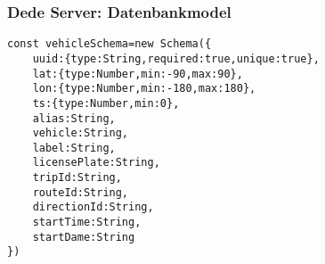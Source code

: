 
\begin{frame}[fragile]
\frametitle{Dede Server: Datenbankmodel}
\begin{lstlisting}
const vehicleSchema=new Schema({
    uuid:{type:String,required:true,unique:true},
    lat:{type:Number,min:-90,max:90},
    lon:{type:Number,min:-180,max:180},
    ts:{type:Number,min:0},
    alias:String,
    vehicle:String,
    label:String,
    licensePlate:String,
    tripId:String,
    routeId:String,
    directionId:String,
    startTime:String,
    startDame:String
})
\end{lstlisting}
\end{frame}
